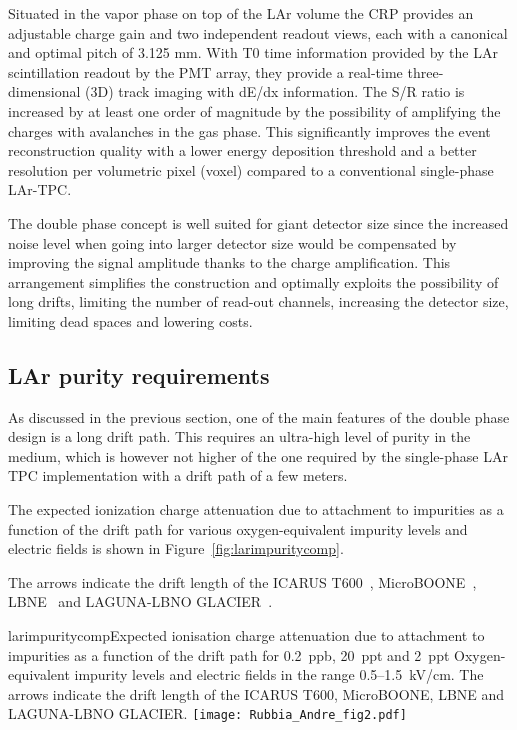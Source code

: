 Situated in the vapor phase on top of the LAr volume the CRP  provides an adjustable charge gain and two independent readout views, each with a canonical and optimal pitch of 3.125 mm.  With T0 time information provided by the LAr scintillation readout by the PMT array, they provide a real-time three-dimensional (3D) track imaging with dE/dx information. The S/R ratio is increased by at least one order of magnitude by the possibility of amplifying the charges with avalanches in the gas phase.  This significantly improves the event reconstruction quality with a lower energy deposition threshold and a better resolution per volumetric pixel (voxel) compared to a conventional single-phase LAr-TPC. 

The double phase concept is well suited for giant detector size since the increased noise level when going into larger detector size would be compensated by improving the signal amplitude thanks to the charge amplification.  This arrangement simplifies the construction and optimally exploits the possibility of long drifts, limiting the number of read-out channels, increasing the detector size, limiting dead spaces and lowering costs.

\subsection{LAr purity requirements}

As discussed in the previous section, one of the main features of the double phase design is a long drift path. This requires an ultra-high level of purity in the medium, which is however not higher of the one required by the single-phase LAr TPC implementation with a drift path of a few meters.

The expected ionization charge attenuation due to attachment to impurities as a function of the drift path for various oxygen-equivalent impurity levels and electric fields is shown in Figure~\ref{fig:larimpuritycomp}.

The arrows indicate the drift length of the ICARUS T600~\cite{Amerio:2004ze},  MicroBOONE~\cite{Chen:2007ae}, LBNE~\cite{Akiri:2011dv} 
and LAGUNA-LBNO GLACIER~\cite{Rubbia:2009md,Rubbia:2010zz}.


\begin{cdrfigure}{larimpuritycomp}{Expected ionisation charge attenuation due to attachment to impurities as a function of the drift path for 0.2~ppb, 20~ppt and  2~ppt Oxygen-equivalent impurity levels and electric fields in the range 0.5--1.5~kV/cm. The arrows indicate the drift length of the ICARUS T600, MicroBOONE, LBNE and LAGUNA-LBNO GLACIER.}
\texttt{[image: Rubbia\_Andre\_fig2.pdf]}
\end{cdrfigure}

